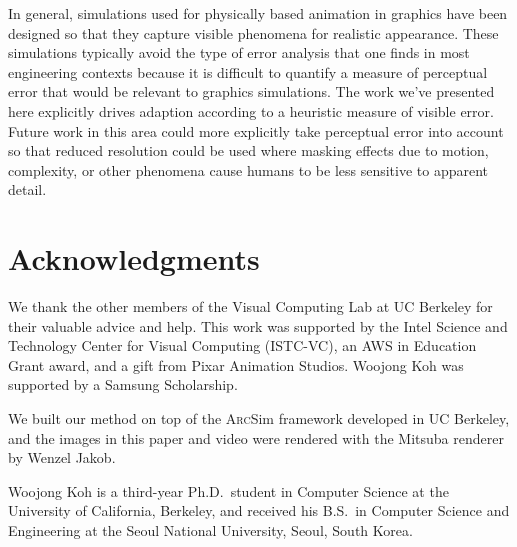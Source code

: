 \documentclass[10pt,journal,compsoc,twoside]{TexInputs/IEEEtran}
\newcommand{\arcsim}{\textsc{Arc}Sim\xspace}
\begin{document}
\vspace{.1in}

In general, simulations used for physically based animation in
graphics have been designed so that they capture visible phenomena for
realistic appearance.  These simulations typically avoid the type of
error analysis that one finds in most engineering contexts because it
is difficult to quantify a measure of perceptual error that would be
relevant to graphics simulations.  The work we've presented here
explicitly drives adaption according to a heuristic measure of visible
error.  Future work in this area could more explicitly
take perceptual error into account so that reduced resolution could be
used where masking effects due to motion, complexity, or other
phenomena cause humans to be less sensitive to apparent detail.



\section*{Acknowledgments}
We thank the other members of the Visual Computing Lab at UC Berkeley for their
valuable advice and help. This work was supported by the Intel Science and Technology
Center for Visual Computing (ISTC-VC), an AWS in Education Grant
award, and a gift from Pixar Animation Studios.  Woojong Koh was supported by a
Samsung Scholarship.

We built our method on top of the \arcsim framework developed in UC Berkeley, and the
images in this paper and video were rendered with the Mitsuba renderer by Wenzel Jakob.

\vspace*{.1in}





\begin{IEEEbiography}
{Woojong Koh} is a third-year Ph.D.~student in Computer Science at the University of
California, Berkeley, and received his B.S.~in Computer Science and Engineering at the
Seoul National University, Seoul, South Korea.
\end{IEEEbiography}
\end{document}
